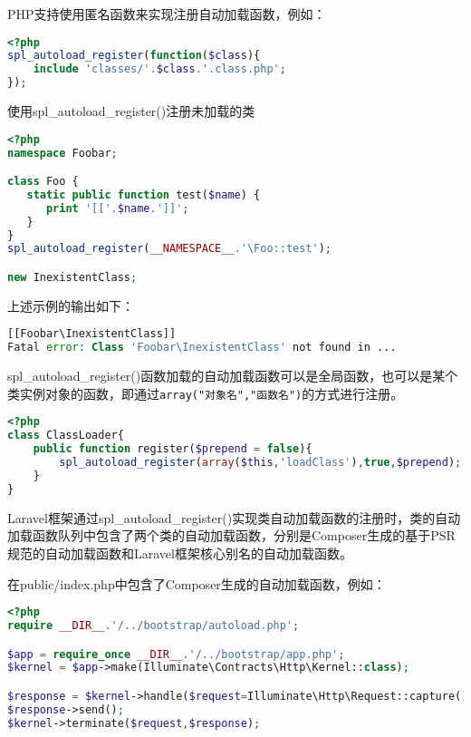 PHP支持使用匿名函数来实现注册自动加载函数，例如：

\begin{lstlisting}[language=PHP]
<?php
spl_autoload_register(function($class){
    include 'classes/'.$class.'.class.php';
});
\end{lstlisting}


\begin{example}
使用spl\_autoload\_register()注册未加载的类
\begin{lstlisting}[language=PHP]
<?php
namespace Foobar;

class Foo {
   static public function test($name) {
      print '[['.$name.']]';
   }
}
spl_autoload_register(__NAMESPACE__.'\Foo::test');

new InexistentClass;
\end{lstlisting}
\end{example}

上述示例的输出如下：

\begin{lstlisting}[language=PHP]
[[Foobar\InexistentClass]]
Fatal error: Class 'Foobar\InexistentClass' not found in ...
\end{lstlisting}

spl\_autoload\_register()函数加载的自动加载函数可以是全局函数，也可以是某个类实例对象的函数，即通过\texttt{array("对象名","函数名")}的方式进行注册。



\begin{lstlisting}[language=PHP]
<?php
class ClassLoader{
    public function register($prepend = false){
        spl_autoload_register(array($this,'loadClass'),true,$prepend);
    }
}
\end{lstlisting}


Laravel框架通过spl\_autoload\_register()实现类自动加载函数的注册时，类的自动加载函数队列中包含了两个类的自动加载函数，分别是Composer生成的基于PSR规范的自动加载函数和Laravel框架核心别名的自动加载函数。

在public/index.php中包含了Composer生成的自动加载函数，例如：


\begin{lstlisting}[language=PHP]
<?php
require __DIR__.'/../bootstrap/autoload.php';

$app = require_once __DIR__.'/../bootstrap/app.php';
$kernel = $app->make(Illuminate\Contracts\Http\Kernel::class);

$response = $kernel->handle($request=Illuminate\Http\Request::capture());
$response->send();
$kernel->terminate($request,$response);
\end{lstlisting}

